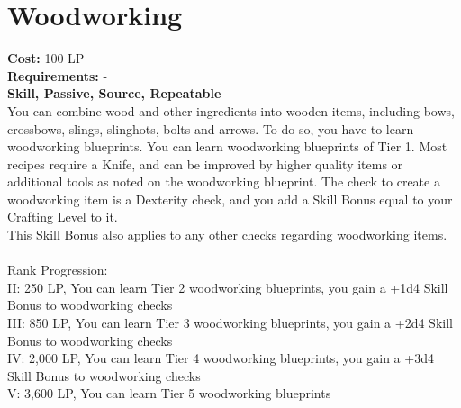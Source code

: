 \section{Woodworking}\label{perk:woodworking}
\textbf{Cost:} 100 LP\\
\textbf{Requirements:} -\\
\textbf{Skill, Passive, Source, Repeatable}\\
You can combine wood and other ingredients into wooden items, including bows, crossbows, slings, slinghots, bolts and arrows.
To do so, you have to learn woodworking blueprints.
You can learn woodworking blueprints of Tier 1.
Most recipes require a Knife, and can be improved by higher quality items or additional tools as noted on the woodworking blueprint.
The check to create a woodworking item is a Dexterity check, and you add a Skill Bonus equal to your Crafting Level to it.\\
This Skill Bonus also applies to any other checks regarding woodworking items.\\
\\
Rank Progression:\\
II: 250 LP, You can learn Tier 2 woodworking blueprints, you gain a +1d4 Skill Bonus to woodworking checks\\
III: 850 LP, You can learn Tier 3 woodworking blueprints, you gain a +2d4 Skill Bonus to woodworking checks\\
IV: 2,000 LP, You can learn Tier 4 woodworking blueprints, you gain a +3d4 Skill Bonus to woodworking checks\\
V: 3,600 LP, You can learn Tier 5 woodworking blueprints\\